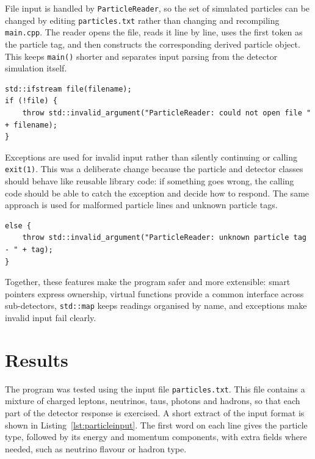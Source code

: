 \documentclass[11pt,a4paper]{article}
\begin{document}
File input is handled by \texttt{ParticleReader}, so the set of simulated particles can be changed by editing \texttt{particles.txt} rather than changing and recompiling \texttt{main.cpp}. The reader opens the file, reads it line by line, uses the first token as the particle tag, and then constructs the corresponding derived particle object. This keeps \texttt{main()} shorter and separates input parsing from the detector simulation itself.

\begin{lstlisting}[caption={Opening the particle input file and reporting failure.}, label={lst:filereader}]
std::ifstream file(filename);
if (!file) {
    throw std::invalid_argument("ParticleReader: could not open file " + filename);
}
\end{lstlisting}

Exceptions are used for invalid input rather than silently continuing or calling \texttt{exit(1)}. This was a deliberate change because the particle and detector classes should behave like reusable library code: if something goes wrong, the calling code should be able to catch the exception and decide how to respond. The same approach is used for malformed particle lines and unknown particle tags.

\begin{lstlisting}[caption={Rejecting an unknown particle tag from the input file.}, label={lst:unknowntag}]
else {
    throw std::invalid_argument("ParticleReader: unknown particle tag - " + tag);
}
\end{lstlisting}

Together, these features make the program safer and more extensible: smart pointers express ownership, virtual functions provide a common interface across sub-detectors, \texttt{std::map} keeps readings organised by name, and exceptions make invalid input fail clearly.

\section{Results}

The program was tested using the input file \texttt{particles.txt}. This file contains a mixture of charged leptons, neutrinos, taus, photons and hadrons, so that each part of the detector response is exercised. A short extract of the input format is shown in Listing~\ref{lst:particleinput}. The first word on each line gives the particle type, followed by its energy and momentum components, with extra fields where needed, such as neutrino flavour or hadron type.
\end{document}
